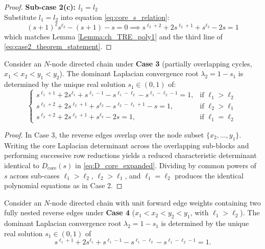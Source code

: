 \begin{proof}
\vspace{0.5em}
\textbf{Sub-case 2(c): $l_1 = l_2$}\\
Substitute $l_1 = l_2$ into equation \eqref{eq:core_s_relation}:
\begin{equation}
	(s+1)^2 s^{\ell_2} - (s+1) - s = 0 \implies s^{\ell_2+2} + 2s^{\ell_2+1} + s^{\ell_2} - 2s = 1
\end{equation}
which matches Lemma \ref{Lemma:ch_TRE_poly1} and the third line of \eqref{eq:case2_theorem_statement}.
\end{proof}

\begin{theo}\label{theo9}
Consider an $N$-node directed chain under \textbf{Case 3} (partially overlapping cycles, $x_1 < x_2 < y_1 < y_2$). The dominant Laplacian convergence root $\lambda_2 = 1 - s_1$ is determined by the unique real solution $s_1 \in (0,1)$ of:
\begin{equation}
	\begin{cases}
		s^{\ell_1+1} + 2s^{\ell_1} + s^{\ell_1-1} - s^{\ell_1-\ell_2} - s^{\ell_1-\ell_2-1} = 1, & \text{if } \ell_1 > \ell_2 \\
		s^{\ell_2+2} + 2s^{\ell_2+1} + s^{\ell_2} - s^{\ell_2-\ell_1+1} - s = 1, & \text{if } \ell_2 > \ell_1 \\
		s^{\ell_2+2} + 2s^{\ell_2+1} + s^{\ell_2} - 2s = 1, & \text{if } \ell_1 = \ell_2
	\end{cases}
\end{equation}
\end{theo}

\begin{proof}
In Case 3, the reverse edges overlap over the node subset $\{x_2, \dots, y_1\}$. Writing the core Laplacian determinant across the overlapping sub-blocks and performing successive row reductions yields a reduced characteristic determinant identical to $D_{\text{core}}(s)$ in \eqref{eq:D_core_expanded}. Dividing by common powers of $s$ across sub-cases $\ell_1 > \ell_2$, $\ell_2 > \ell_1$, and $\ell_1 = \ell_2$ produces the identical polynomial equations as in Case 2.
\end{proof}

\begin{theo}\label{Theoremcase4}
Consider an $N$-node directed chain with unit forward edge weights containing two fully nested reverse edges under \textbf{Case 4} ($x_1 < x_2 < y_2 < y_1$, with $\ell_1 > \ell_2$). The dominant Laplacian convergence root $\lambda_2 = 1 - s_1$ is determined by the unique real solution $s_1 \in (0,1)$ of
\begin{equation}\label{eq:case4_theorem_statement}
	s^{\ell_1+1} + 2s^{\ell_1} + s^{\ell_1-1} - s^{\ell_1-\ell_2} - s^{\ell_1-\ell_2-1} = 1.
\end{equation}
\end{theo}

